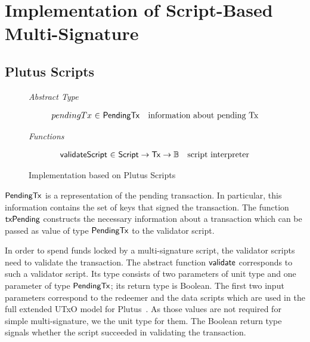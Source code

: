 \documentclass[11pt,a4paper,dvipsnames]{article}
\newcommand{\Bool}{\ensuremath{\mathbb{B}}}
\newcommand{\Tx}{\type{Tx}}
\newcommand{\Script}{\type{Script}}
\newcommand{\PendingTx}{\type{PendingTx}}
\theoremstyle{definition}
\begin{document}
\section{Implementation of Script-Based Multi-Signature}
\label{sec:altern-impl}


\subsection{Plutus Scripts}
\label{sec:plutus-scripts}

\begin{figure*}[hbt]
  \emph{Abstract Type}

  \begin{equation*}
    \begin{array}{r@{~\in~}lr}
      pendingTx & \PendingTx & \text{information about pending Tx}
    \end{array}
  \end{equation*}

  \emph{Functions}

  \begin{equation*}
    \begin{array}{r@{~\in~}lr}
      \fun{validateScript} & \Script \to \Tx \to \Bool & \text{script interpreter}
    \end{array}
  \end{equation*}
  \caption{Implementation based on Plutus Scripts}
  \label{fig:types_defs_plutus}
\end{figure*}

$\PendingTx$ is a representation of the pending transaction. In particular, this
information contains the set of keys that signed the transaction. The function
$\mathsf{txPending}$ constructs the necessary information about a transaction
which can be passed as value of type $\PendingTx$ to the validator script.

In order to spend funds locked by a multi-signature script, the validator
scripts need to validate the transaction. The abstract function $\mathsf{validate}$
corresponds to such a validator script. Its type consists of two parameters of
unit type and one parameter of type $\PendingTx$; its return type is
Boolean. The first two input parameters correspond to the redeemer and the data
scripts which are used in the full extended UTxO model for
Plutus~\cite{plutus_eutxo}. As those values are not required for simple
multi-signature, we the unit type for them. The Boolean return type signals
whether the script succeeded in validating the transaction.
\end{document}
